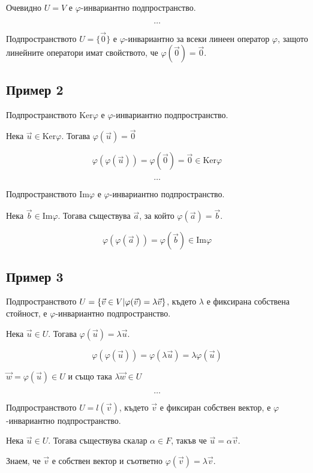 \documentclass{scrartcl}
\begin{document}
\begin{FlushLeft}
Очевидно $U = V$ е $\varphi$-инвариантно подпространство.

$$\dots$$

Подпространството $U = \lbrace \vec{0} \rbrace$ е $\varphi$-инвариантно за всеки линеен оператор $\varphi$, защото линейните оператори имат свойството, че $\varphi(\vec{0}) = \vec{0}$.

\subsection{Пример 2}

Подпространството $\text{Ker}\varphi$ е $\varphi$-инвариантно подпространство.

Нека $\vec{u} \in \text{Ker}\varphi$. Тогава $\varphi(\vec{u}) = \vec{0}$

$$\varphi(\varphi(\vec{u})) = \varphi(\vec{0}) = \vec{0} \in \text{Ker}\varphi$$

$$\dots$$

Подпространството $\text{Im}\varphi$ е $\varphi$-инвариантно подпространство.

Нека $\vec{b} \in \text{Im}\varphi$. Тогава съществува $\vec{a}$, за който $\varphi(\vec{a}) = \vec{b}$.

$$\varphi(\varphi(\vec{a})) = \varphi(\vec{b}) \in \text{Im}\varphi$$

\subsection{Пример 3}

Подпространството $U = \{\vec{v} \in V \space | \space \varphi(\vec{v}) = \lambda \vec{v}\}$, където $\lambda$ е фиксирана собствена стойност, е $\varphi$-инвариантно подпространство.

Нека $\vec{u} \in U$. Тогава $\varphi(\vec{u}) = \lambda \vec{u}$.

$$\varphi(\varphi(\vec{u})) = \varphi(\lambda \vec{u}) = \lambda\varphi(\vec{u})$$

$\vec{w} = \varphi(\vec{u}) \in U$ и също така $\lambda \vec{w} \in U$

$$\dots$$

Подпространството $U = l(\vec{v})$, където $\vec{v}$ е фиксиран собствен вектор, е $\varphi$-инвариантно подпространство.

Нека $\vec{u} \in U$. Тогава съществува скалар $\alpha \in F$, такъв че $\vec{u} = \alpha \vec{v}$.

Знаем, че $\vec{v}$ е собствен вектор и съответно $\varphi(\vec{v}) = \lambda \vec{v}$.


\end{FlushLeft}
\end{document}
